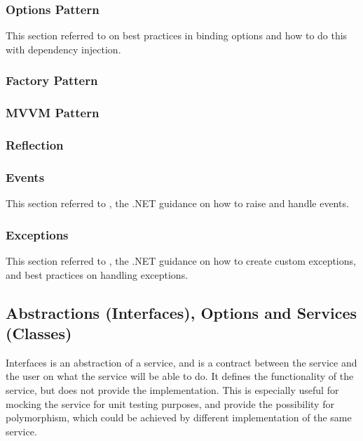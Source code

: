\subsubsection{Options Pattern}

This section referred to \autocite{dotnet-tutorial-configuration} on best practices in binding options and how to do this with dependency injection.

\subsubsection{Factory Pattern}

\subsubsection{MVVM Pattern}

\subsubsection{Reflection}

\subsubsection{Events}

This section referred to \autocite{dotnet-tutorial-events}, the .NET guidance on how to raise and handle events.

\subsubsection{Exceptions}

This section referred to \autocite{dotnet-tutorial-exception}, the .NET guidance on how to create custom exceptions, and best practices on handling exceptions.

\subsection{Abstractions (Interfaces), Options and Services (Classes)}

Interfaces is an abstraction of a service, and is a contract between the service and the user on what the service will be able to do. It defines the functionality of the service, but does not provide the implementation. This is especially useful for mocking the service for unit testing purposes, and provide the possibility for polymorphism, which could be achieved by different implementation of the same service.

